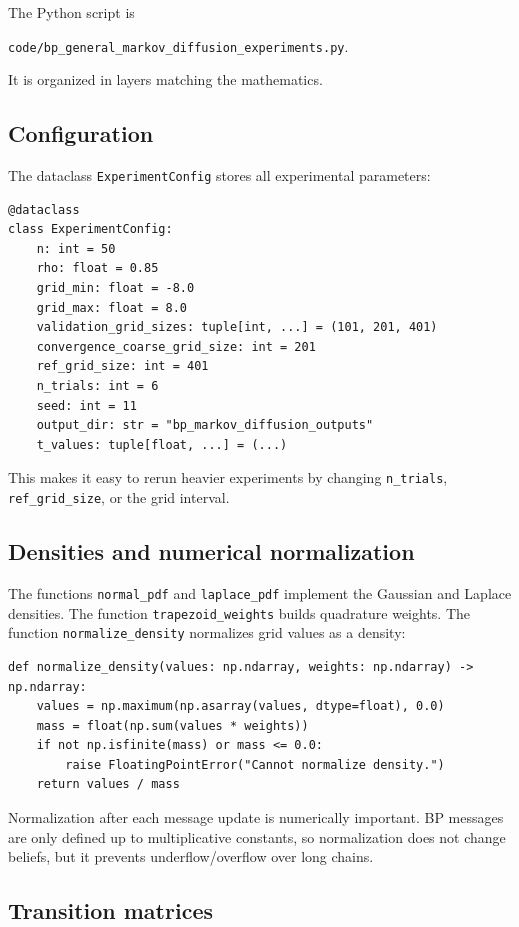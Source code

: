 \documentclass[11pt]{article}
\begin{document}
The Python script is
\begin{center}
\texttt{code/bp\_general\_markov\_diffusion\_experiments.py}.
\end{center}
It is organized in layers matching the mathematics.

\subsection{Configuration}

The dataclass \texttt{ExperimentConfig} stores all experimental parameters:
\begin{lstlisting}[style=pythonstyle]
@dataclass
class ExperimentConfig:
    n: int = 50
    rho: float = 0.85
    grid_min: float = -8.0
    grid_max: float = 8.0
    validation_grid_sizes: tuple[int, ...] = (101, 201, 401)
    convergence_coarse_grid_size: int = 201
    ref_grid_size: int = 401
    n_trials: int = 6
    seed: int = 11
    output_dir: str = "bp_markov_diffusion_outputs"
    t_values: tuple[float, ...] = (...)
\end{lstlisting}
This makes it easy to rerun heavier experiments by changing \texttt{n\_trials}, \texttt{ref\_grid\_size}, or the grid interval.

\subsection{Densities and numerical normalization}

The functions \texttt{normal\_pdf} and \texttt{laplace\_pdf} implement the Gaussian and Laplace densities. The function \texttt{trapezoid\_weights} builds quadrature weights. The function \texttt{normalize\_density} normalizes grid values as a density:
\begin{lstlisting}[style=pythonstyle]
def normalize_density(values: np.ndarray, weights: np.ndarray) -> np.ndarray:
    values = np.maximum(np.asarray(values, dtype=float), 0.0)
    mass = float(np.sum(values * weights))
    if not np.isfinite(mass) or mass <= 0.0:
        raise FloatingPointError("Cannot normalize density.")
    return values / mass
\end{lstlisting}
Normalization after each message update is numerically important. BP messages are only defined up to multiplicative constants, so normalization does not change beliefs, but it prevents underflow/overflow over long chains.

\subsection{Transition matrices}
\end{document}
